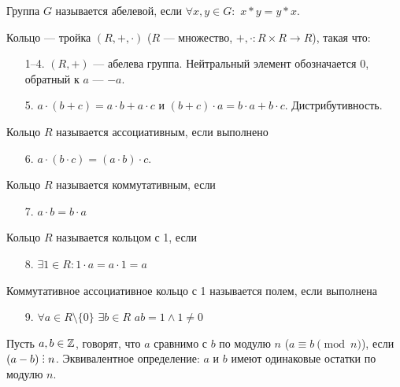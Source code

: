 \begin{definition}
    Группа $G$ называется абелевой, если  $\forall x, y \in G:$ $x \ast y = y \ast x$.
\end{definition}
\begin{definition}
    Кольцо --- тройка $(R, +, \cdot)$ ($R$ --- множество,  $+, \cdot: R \times R \to R$), такая что:
     \begin{enumerate}
         \item[1--4.] $(R, +)$ --- абелева группа. Нейтральный элемент обозначается $0$, обратный к  $a$ ---  $-a$.
         \item[5.] $a\cdot(b+c) = a \cdot b + a \cdot c$ и  $(b+c) \cdot a = b \cdot a + b \cdot c$. Дистрибутивность.
    \end{enumerate}
\end{definition}
\begin{definition}
    Кольцо $R$ называется ассоциативным, если выполнено 
    \begin{itemize}
        \item[6.] $a \cdot (b \cdot c) = (a \cdot b) \cdot c$.
    \end{itemize}
\end{definition}
\begin{definition}
    Кольцо $R$ называется коммутативным, если
    \begin{itemize}
        \item[7.] $a \cdot b = b \cdot a$
    \end{itemize}
\end{definition}
\begin{definition}
    Кольцо $R$ называется кольцом с 1, если  
    \begin{enumerate}
        
        \item[8.] $\exists 1 \in R: 1 \cdot a = a \cdot 1 = a$
    \end{enumerate}
\end{definition}
\begin{definition}
    Коммутативное ассоциативное кольцо с 1 называется полем, если выполнена 
    \begin{enumerate}
        \item[9.] $\forall a \in R \setminus \{0\}$  $\exists b \in R$  $ab = 1 \land 1 \neq 0$
    \end{enumerate}
\end{definition}
\begin{definition}
	Пусть $a, b \in \mathbb{Z}$, говорят, что  $a$ сравнимо с  $b$ по модулю  $n$ ($a \equiv b \pmod{n}$), если $(a - b) \divby n$. Эквивалентное определение:  $a$ и  $b$ имеют одинаковые остатки по модулю  $n$.
\end{definition}
